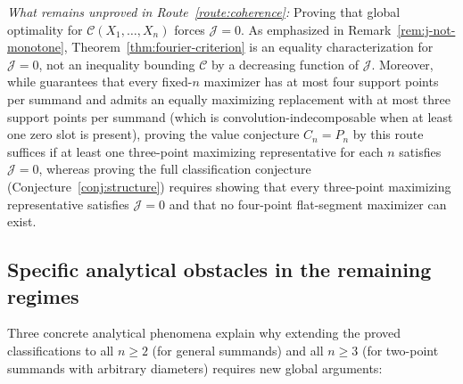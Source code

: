 \documentclass[11pt]{article}
\numberwithin{equation}{section}
\theoremstyle{definition}
\theoremstyle{remark}
\begin{document}
\begin{enumerate}[label=\textbf{Route \arabic*.},ref=\arabic*,leftmargin=5.5em]
\emph{What remains unproved in Route~\ref{route:coherence}:} Proving that
global optimality for $\mathcal C(X_1,\ldots,X_n)$ forces $\mathcal J=0$. As
emphasized in Remark~\ref{rem:j-not-monotone}, Theorem~\ref{thm:fourier-criterion}
is an equality characterization for $\mathcal J=0$, not an inequality bounding
$\mathcal C$ by a decreasing function of $\mathcal J$. Moreover, while
\citet[Theorem~3.2]{BellExtremizers2026} guarantees that every fixed-$n$
maximizer has at most four support points per summand and admits an equally
maximizing replacement with at most three support points per summand (which is
convolution-indecomposable when at least one zero slot is present), proving
the value conjecture $C_n=P_n$ by this route suffices if at least one
three-point maximizing representative for each $n$ satisfies $\mathcal J=0$,
whereas proving the full classification conjecture
(Conjecture~\ref{conj:structure}) requires showing that every three-point
maximizing representative satisfies $\mathcal J=0$ and that no four-point
flat-segment maximizer can exist.
\end{enumerate}

\subsection{Specific analytical obstacles in the remaining regimes}\label{subsec:obstacles}

Three concrete analytical phenomena explain why extending the proved
classifications to all $n\ge2$ (for general summands) and all $n\ge3$ (for
two-point summands with arbitrary diameters) requires new global arguments:
\end{document}
